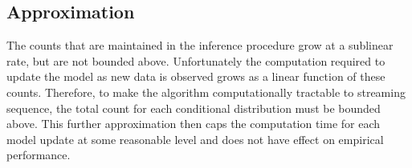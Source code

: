 \subsection{Approximation}

The counts that are maintained in the inference procedure grow at a sublinear rate, but are not bounded above.  Unfortunately the computation required to update the model as new data is observed grows as a linear function of these counts.  Therefore, to make the algorithm computationally tractable to streaming sequence, the total count for each conditional distribution must be bounded above.  This further approximation then caps the computation time for each model update at some reasonable level and does not have effect on empirical performance.  